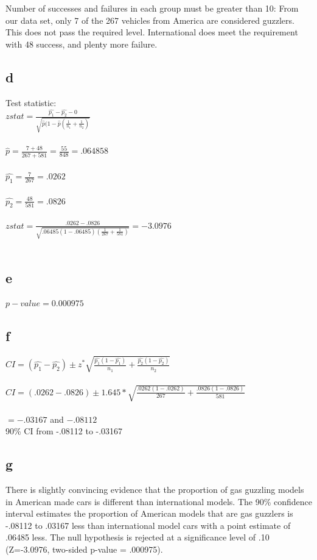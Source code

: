\documentclass[10pt,letterpaper]{article}
\begin{document}
Number of successes and failures in each group must be greater than 10:
From our data set, only 7 of the 267 vehicles from America are considered
guzzlers. This does not pass the required level. International does meet the
requirement with 48 success, and plenty more failure.

\subsection*{d}
Test statistic:\\
$z stat=\frac{\hat{p_1}-\hat{p_2}-0}
{\sqrt{\hat{p}(1-\hat{p}(\frac{1}{n_1}+\frac{1}{n_2})}}$\\\\

$\hat{p}=\frac{7+48}{267+581}=\frac{55}{848}=.064858$\\\\
$\hat{p_1}=\frac{7}{267}=.0262$\\\\
$\hat{p_2}=\frac{48}{581}=.0826$\\\\

$z stat=\frac{.0262-.0826}
{\sqrt{.06485(1-.06485)(\frac{1}{267}+\frac{1}{581})}}=-3.0976$\\\\

\subsection*{e}
$p-value=0.000975$

\subsection*{f}
$CI=(\hat{p_1}-\hat{p_2}) \pm z^* \sqrt{\frac{\hat{p_1}(1-\hat{p_1})}{n_1}+
\frac{\hat{p_2}(1-\hat{p_2})}{n_2}}$\\\\
$CI=(.0262-.0826) \pm 1.645 * \sqrt{\frac{.0262(1-.0262)}{267}+
\frac{.0826(1-.0826)}{581}}$\\\\
$=-.03167$ and $-.08112$\\

90\% CI from -.08112 to -.03167

\subsection*{g}
There is slightly convincing evidence that the proportion of gas guzzling
models in American made cars is different than international models. The 90\%
confidence interval estimates the proportion of American models that are gas
guzzlers is -.08112 to .03167 less than international model cars with a point
estimate of .06485 less. The null hypothesis is rejected at a significance level
of .10 (Z=-3.0976, two-sided p-value = .000975).
\end{document}
